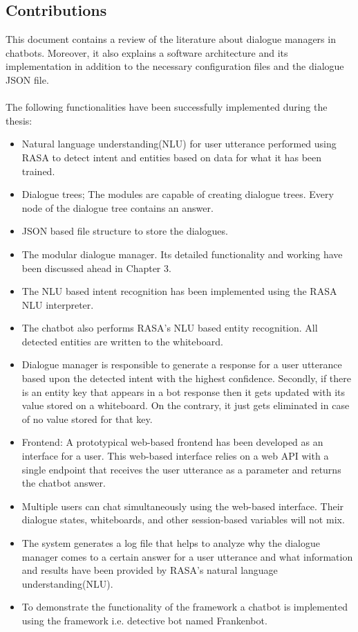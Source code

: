 \subsection{Contributions}
This document contains a review of the literature about dialogue managers in chatbots. Moreover, it also explains a software architecture and its implementation in addition to the necessary configuration files and the dialogue JSON file.
\\~\\
The following functionalities have been successfully implemented during the thesis:
\begin{itemize}
  \item Natural language understanding(NLU) for user utterance performed using RASA to detect intent and entities based on data for what it has been trained.
   \item Dialogue trees; The modules are capable of creating dialogue trees. Every node of the dialogue tree contains an answer.
   \item JSON based file structure to store the dialogues.
   \item The modular dialogue manager. Its detailed functionality and working have been discussed ahead in Chapter 3.
   \item The NLU based intent recognition has been implemented using the RASA NLU interpreter.
   \item The chatbot also performs RASA's NLU based entity recognition. All detected entities are written to the whiteboard.
   \item Dialogue manager is responsible to generate a response for a user utterance based upon the detected intent with the highest confidence. Secondly, if there is an entity key that appears in a bot response then it gets updated with its value stored on a whiteboard. On the contrary, it just gets eliminated in case of no value stored for that key.
   \item Frontend: A prototypical web-based frontend has been developed as an interface for a user. This web-based interface relies on a  web API with a single endpoint that receives the user utterance as a parameter and returns the chatbot answer.
   \item Multiple users can chat simultaneously using the web-based interface. Their dialogue states, whiteboards, and other session-based variables will not mix.
   \item The system generates a log file that helps to analyze why the dialogue manager comes to a certain answer for a user utterance and what information and results have been provided by RASA's natural language understanding(NLU).
   \item To demonstrate the functionality of the framework a chatbot is implemented using the framework i.e. detective bot named Frankenbot.
\end{itemize}

